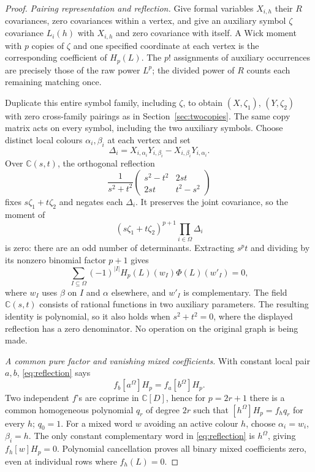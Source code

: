 \documentclass[11pt]{article}
\theoremstyle{definition}
\theoremstyle{plain}
\numberwithin{equation}{section}
\begin{document}
\begin{proof}
\emph{Pairing representation and reflection.}
Give formal variables \(X_{i,h}\) their \(R\) covariances, zero covariances
within a vertex, and give an auxiliary symbol \(\zeta\) covariance \(L_i(h)\) with
\(X_{i,h}\) and zero covariance with itself. A Wick moment with \(p\) copies
of \(\zeta\) and one specified coordinate at each vertex is the corresponding
coefficient of \(H_p(L)\). The \(p!\) assignments of auxiliary occurrences
are precisely those of the raw power \(L^p\); the divided power of \(R\)
counts each remaining matching once.

Duplicate this entire symbol family, including \(\zeta\), to obtain
\((X,\zeta_1)\), \((Y,\zeta_2)\) with zero cross-family pairings as in
Section~\ref{sec:twocopies}. The same copy matrix acts on every symbol,
including the two auxiliary symbols. Choose
distinct local colours \(\alpha_i,\beta_i\) at each vertex and set
\[
 \Delta_i=X_{i,\alpha_i}Y_{i,\beta_i}
              -X_{i,\beta_i}Y_{i,\alpha_i}.
\]
Over \(\mathbb C(s,t)\), the orthogonal reflection
\[
 \frac{1}{s^2+t^2}
 \begin{pmatrix}s^2-t^2&2st\\2st&t^2-s^2\end{pmatrix}
\]
fixes \(s\zeta_1+t\zeta_2\) and negates each \(\Delta_i\). It preserves the joint
covariance, so the moment of
\[
 (s\zeta_1+t\zeta_2)^{p+1}\prod_{i\in\Omega}\Delta_i
\]
is zero: there are an odd number of determinants. Extracting \(s^pt\)
and dividing by its nonzero binomial factor \(p+1\) gives
\begin{equation}
 \sum_{I\subseteq\Omega}(-1)^{|I|}H_p(L)(w_I)\Phi(L)(w'_I)=0,
 \tag{3}\label{eq:reflection}
\end{equation}
where \(w_I\) uses \(\beta\) on \(I\) and \(\alpha\) elsewhere, and \(w'_I\)
is complementary. The field \(\mathbb C(s,t)\) consists of rational
functions in two auxiliary parameters. The resulting identity is polynomial,
so it also holds when \(s^2+t^2=0\), where the displayed reflection has a
zero denominator. No operation on the original graph is being made.

\emph{A common pure factor and vanishing mixed coefficients.}
With constant local pair \(a,b\), \eqref{eq:reflection} says
\[
 f_b[a^\Omega]H_p=f_a[b^\Omega]H_p.
\]
Two independent \(f\)'s are coprime in \(\mathbb C[D]\), hence for
\(p=2r+1\) there is a common homogeneous polynomial \(q_r\) of degree
\(2r\) such that \([h^\Omega]H_p=f_hq_r\) for every \(h\); \(q_0=1\).
For a mixed word \(w\) avoiding an active colour \(h\), choose
\(\alpha_i=w_i\), \(\beta_i=h\). The only constant complementary word in
\eqref{eq:reflection} is \(h^\Omega\), giving \(f_h[w]H_p=0\). Polynomial
cancellation proves all binary mixed coefficients zero, even at individual
rows where \(f_h(L)=0\).


\end{proof}
\end{document}

